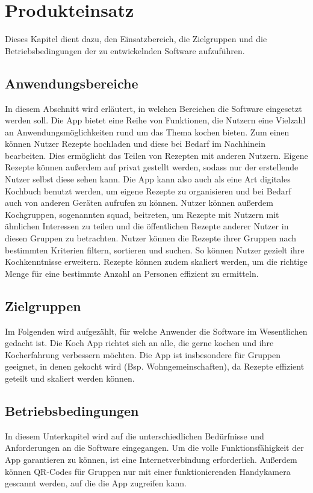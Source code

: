 \documentclass[parskip=full]{scrartcl}
\begin{document}
\section{Produkteinsatz}
Dieses Kapitel dient dazu, den Einsatzbereich, die Zielgruppen und die Betriebsbedingungen der zu entwickelnden Software aufzuführen.

\subsection{Anwendungsbereiche}
In diesem Abschnitt wird erläutert, in welchen Bereichen die Software eingesetzt werden soll. \newline
Die App bietet eine Reihe von Funktionen, die Nutzern eine Vielzahl an Anwendungsmöglichkeiten rund um das Thema kochen bieten.
Zum einen können Nutzer Rezepte hochladen und diese bei Bedarf im Nachhinein bearbeiten.
Dies ermöglicht das Teilen von Rezepten mit anderen Nutzern. Eigene Rezepte können außerdem auf privat gestellt werden, sodass nur der erstellende Nutzer selbst diese sehen kann.
Die App kann also auch als eine Art digitales Kochbuch benutzt werden, um eigene Rezepte zu organisieren und bei Bedarf auch von anderen Geräten aufrufen zu können.
Nutzer können außerdem Kochgruppen, sogenannten \Gls{squad}, beitreten, um Rezepte mit Nutzern mit ähnlichen Interessen zu teilen und die öffentlichen Rezepte anderer Nutzer in diesen Gruppen zu betrachten. Nutzer können die Rezepte ihrer Gruppen nach bestimmten Kriterien filtern, sortieren und suchen. So können Nutzer gezielt ihre Kochkenntnisse erweitern.
Rezepte können zudem skaliert werden, um die richtige Menge für eine bestimmte Anzahl an Personen effizient zu ermitteln.

\subsection{Zielgruppen}
Im Folgenden wird aufgezählt, für welche Anwender die Software im Wesentlichen gedacht ist. \newline
Die Koch App richtet sich an alle, die gerne kochen und ihre Kocherfahrung verbessern möchten.
Die App ist insbesondere für Gruppen geeignet, in denen gekocht wird (Bsp. Wohngemeinschaften), da Rezepte effizient geteilt und skaliert werden können.

\subsection{Betriebsbedingungen}
In diesem Unterkapitel wird auf die unterschiedlichen Bedürfnisse und Anforderungen an die Software eingegangen. \newline
Um die volle Funktionsfähigkeit der App garantieren zu können, ist eine Internetverbindung erforderlich. Außerdem können QR-Codes für Gruppen nur mit einer funktionierenden Handykamera gescannt werden, auf die die App zugreifen kann.
\end{document}
